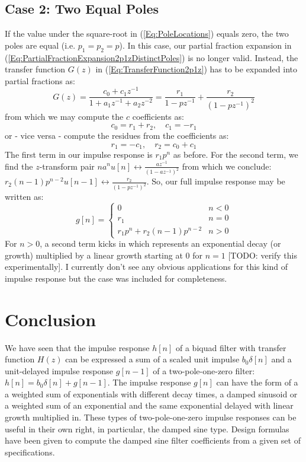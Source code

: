 \subsection{Case 2: Two Equal Poles}
If the value under the square-root in (\ref{Eq:PoleLocations}) equals zero, the two poles are equal (i.e. $p_1 = p_2 = p$). In this case, our partial fraction expansion in (\ref{Eq:PartialFractionExpansion2p1zDistinctPoles}) is no longer valid. Instead, the transfer function $G(z)$ in (\ref{Eq:TransferFunction2p1z}) has to be expanded into partial fractions as:
\begin{equation}
 G(z) = \frac{c_0 + c_1 z^{-1}} {1 + a_1 z^{-1} + a_2 z^{-2}} = \frac{r_1}{1 - p z^{-1}} + \frac{r_2}{(1 - p z^{-1})^2} 
\end{equation} 
from which we may compute the $c$ coefficients as:
\begin{equation}
\label{Eq:NumeratorCoeffs2p1zEqualPoles}
 c_0 = r_1 + r_2, \quad c_1 = -r_1
\end{equation}
or - vice versa - compute the residues from the coefficients as:
\begin{equation}
\label{Eq:ResiduesEqualPoles}
 r_1 = -c_1, \quad r_2 = c_0 + c_1
\end{equation}
The first term in our impulse response is $r_1 p^n$ as before. For the second term, we find the $z$-transform pair $n a^n u[n] \leftrightarrow \frac{a z^{-1}}{(1-a z^{-1})^2}$ from which we conclude: $r_2 (n-1) p^{n-2} u[n-1] \leftrightarrow \frac{r_2}{(1-p z^{-1})^2}$. So, our full impulse response may be written as:
\begin{equation}
\label{Eq:ImpRespEqualPoles}
 g[n] =
 \begin{cases}
  0                             & n < 0 \\ 
  r_1                           & n = 0 \\
  r_1 p^n + r_2 (n-1) p^{n-2}   & n > 0
 \end{cases}
\end{equation}
For $n>0$, a second term kicks in which represents an exponential decay (or growth) multiplied by a linear growth starting at $0$ for $n=1$ [TODO: verify this experimentally]. I currently don't see any obvious applications for this kind of impulse response but the case was included for completeness.


\section{Conclusion}
We have seen that the impulse response $h[n]$ of a biquad filter with transfer function $H(z)$ can be expressed a sum of a scaled unit impulse $b_0 \delta[n]$ and a unit-delayed impulse response $g[n-1]$ of a two-pole-one-zero filter: $h[n] = b_0 \delta[n] + g[n-1]$. The impulse response $g[n]$ can have the form of a a weighted sum of exponentials with different decay times, a damped sinusoid or a weighted sum of an exponential and the same exponential delayed with linear growth multiplied in. These types of two-pole-one-zero impulse responses can be useful in their own right, in particular, the damped sine type. Design formulas have been given to compute the damped sine filter coefficients from a given set of specifications.
